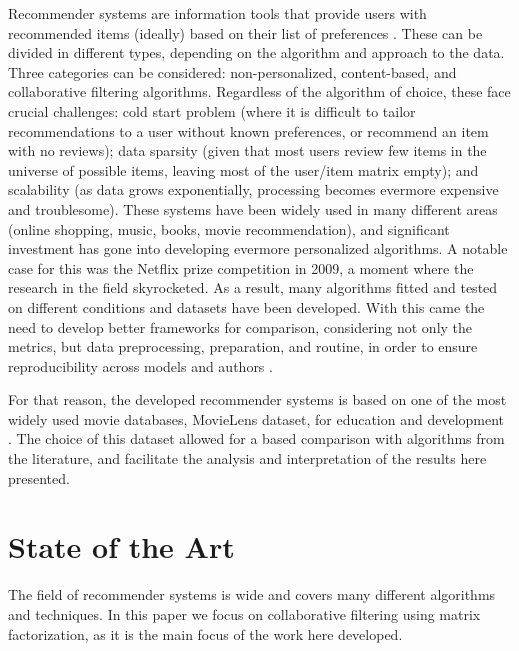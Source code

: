 \documentclass[conference]{IEEEtran}
\begin{document}

Recommender systems are information tools that provide users with recommended items (ideally) based on their list of preferences \cite{Konstan2012,KATARYA2017105}. These can be divided in different types, depending on the algorithm and approach to the data. Three categories can be considered: non-personalized, content-based, and collaborative filtering algorithms. Regardless of the algorithm of choice, these face crucial challenges: cold start problem (where it is difficult to tailor recommendations to a user without known preferences, or recommend an item with no reviews); data sparsity (given that most users review few items in the universe of possible items, leaving most of the user/item matrix empty); and scalability (as data grows exponentially, processing becomes evermore expensive and troublesome). These systems have been widely used in many different areas (online shopping, music, books, movie recommendation), and significant investment has gone into developing evermore personalized algorithms. A notable case for this was the Netflix prize competition in 2009, a moment where the research in the field skyrocketed. As a result, many algorithms fitted and tested on different conditions and datasets have been developed. With this came the need to develop better frameworks for comparison, considering not only the metrics, but data preprocessing, preparation, and routine, in order to ensure reproducibility across models and authors \cite{10.1145/2645710.2645746}.

For that reason, the developed recommender systems is based on one of the most widely used movie databases, MovieLens dataset, for education and development \cite{Harper2015}. The choice of this dataset allowed for a based comparison with algorithms from the literature, and facilitate the analysis and interpretation of the results here presented. 

\section{State of the Art}

The field of recommender systems is wide and covers many different algorithms and techniques. In this paper we focus on collaborative filtering using matrix factorization, as it is the main focus of the work here developed.
\end{document}
